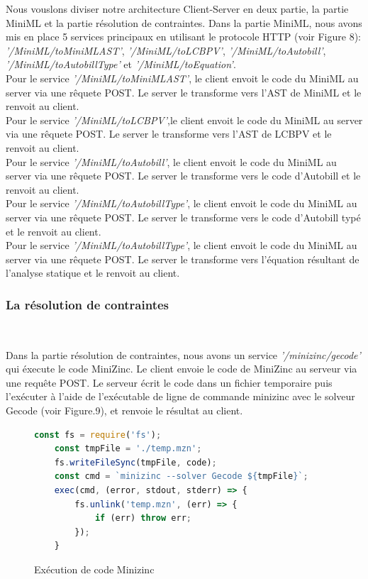 \documentclass[12pt]{article}
\begin{document}
\newpage

Nous vouslons diviser notre architecture Client-Server en deux partie, la partie MiniML et la partie résolution de contraintes. Dans la partie MiniML, nous avons mis en place 5 services principaux en utilisant le protocole HTTP (voir Figure 8): \emph{'/MiniML/toMiniMLAST'}, \emph{'/MiniML/toLCBPV'}, \emph{'/MiniML/toAutobill'}, \emph{'/MiniML/toAutobillType'} et \emph{'/MiniML/toEquation'}. \\
Pour le service \emph{'/MiniML/toMiniMLAST'}, le client envoit le code du MiniML au server via une rêquete POST. Le server le transforme vers l'AST de MiniML et le renvoit au client.\\
Pour le service \emph{'/MiniML/toLCBPV'},le client envoit le code du MiniML au server via une rêquete POST. Le server le transforme vers l'AST de LCBPV et le renvoit au client.\\
Pour le service \emph{'/MiniML/toAutobill'}, le client envoit le code du MiniML au server via une rêquete POST. Le server le transforme vers le code d'Autobill et le renvoit au client.\\
Pour le service \emph{'/MiniML/toAutobillType'}, le client envoit le code du MiniML au server via une rêquete POST. Le server le transforme vers le code d'Autobill typé et le renvoit au client.\\
Pour le service \emph{'/MiniML/toAutobillType'}, le client envoit le code du MiniML au server via une rêquete POST. Le server le transforme vers l'équation résultant de l'analyse statique et le renvoit au client.\\


\subsubsection{La résolution de contraintes}\

Dans la partie résolution de contraintes, nous avons un service \emph{'/minizinc/gecode'} qui éxecute le code MiniZinc. Le client envoie le code de MiniZinc au serveur via une requête POST. Le serveur écrit le code dans un fichier temporaire puis l'exécuter à l'aide de l'exécutable de ligne de commande minizinc avec le solveur Gecode (voir Figure.9), et renvoie le résultat au client.

\begin{figure}
      \centering
      \begin{lstlisting}[language=javascript]
    const fs = require('fs');
    const tmpFile = './temp.mzn';
    fs.writeFileSync(tmpFile, code);
    const cmd = `minizinc --solver Gecode ${tmpFile}`;
    exec(cmd, (error, stdout, stderr) => {
        fs.unlink('temp.mzn', (err) => {
            if (err) throw err;
        });
    }
\end{lstlisting}
      \caption{Exécution de code Minizinc}
\end{figure}
\end{document}
